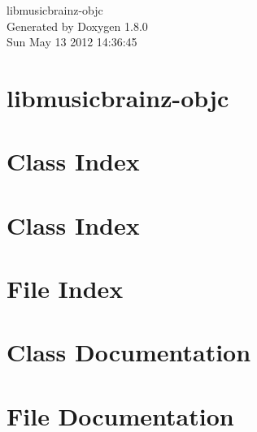 \documentclass{book}
\begin{document}
\hypersetup{pageanchor=false,citecolor=blue}
\begin{titlepage}
\vspace*{7cm}
\begin{center}
{\Large libmusicbrainz-\/objc }\\
\vspace*{1cm}
{\large Generated by Doxygen 1.8.0}\\
\vspace*{0.5cm}
{\small Sun May 13 2012 14:36:45}\\
\end{center}
\end{titlepage}
\clearemptydoublepage
{}
\tableofcontents
\clearemptydoublepage
{}
\hypersetup{pageanchor=true,citecolor=blue}
\chapter{libmusicbrainz-\/objc}
\label{index}\hypertarget{index}{}
\chapter{Class Index}

\chapter{Class Index}

\chapter{File Index}

\chapter{Class Documentation}










\chapter{File Documentation}




















\printindex
\end{document}
